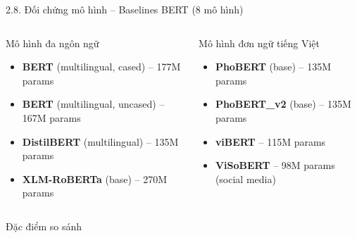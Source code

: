 \documentclass[11pt, aspectratio=169]{beamer}
\begin{document}
\begin{frame}[shrink=5]{2.8. Đối chứng mô hình -- Baselines BERT (8 mô hình)}

\begin{columns}[T]
  \begin{block}{Mô hình đa ngôn ngữ}
    \begin{itemize}
      \item \textbf{BERT} (multilingual, cased) -- 177M params
      \item \textbf{BERT} (multilingual, uncased) -- 167M params
      \item \textbf{DistilBERT} (multilingual) -- 135M params
      \item \textbf{XLM-RoBERTa} (base) -- 270M params
    \end{itemize}
  \end{block}

  \begin{block}{Mô hình đơn ngữ tiếng Việt}
    \begin{itemize}
      \item \textbf{PhoBERT} (base) -- 135M params
      \item \textbf{PhoBERT\_v2} (base) -- 135M params
      \item \textbf{viBERT} -- 115M params
      \item \textbf{ViSoBERT} -- 98M params (social media)
    \end{itemize}
  \end{block}
\end{columns}

\vspace{0.3cm}
\begin{block}{Đặc điểm so sánh}
  \centering
\end{block}
\end{frame}
\end{document}
